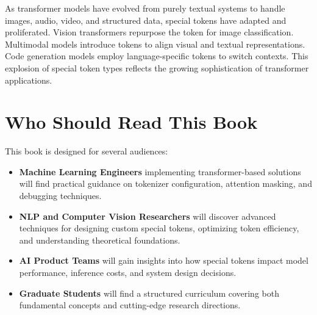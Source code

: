 As transformer models have evolved from purely textual systems to handle images, audio, video, and structured data, special tokens have adapted and proliferated. Vision transformers repurpose the \cls{} token for image classification. Multimodal models introduce \img{} tokens to align visual and textual representations. Code generation models employ language-specific tokens to switch contexts. This explosion of special token types reflects the growing sophistication of transformer applications.
\begin{comment}
Feedback: The term "explosion" is a bit cliché in technical writing. Consider a more precise alternative like "This proliferation of special tokens..." or "This diversification...". Also, the examples are great. Could you perhaps hint at the challenges this proliferation creates? E.g., "This proliferation... reflects the growing sophistication... but also introduces new challenges in vocabulary management and cross-modal alignment that this book will address."
\end{comment}

\section*{Who Should Read This Book}

This book is designed for several audiences:

\begin{itemize}[leftmargin=*]
\item \textbf{Machine Learning Engineers} implementing transformer-based solutions will find practical guidance on tokenizer configuration, attention masking, and debugging techniques.

\item \textbf{NLP and Computer Vision Researchers} will discover advanced techniques for designing custom special tokens, optimizing token efficiency, and understanding theoretical foundations.

\item \textbf{AI Product Teams} will gain insights into how special tokens impact model performance, inference costs, and system design decisions.

\item \textbf{Graduate Students} will find a structured curriculum covering both fundamental concepts and cutting-edge research directions.
\end{itemize}
\begin{comment}
Feedback: This section is clear, but a little boilerplate. To make it more compelling, you could frame each point around a problem that audience faces. For example, for ML Engineers: "For Machine Learning Engineers struggling with tokenizer errors or mysterious performance drops, this book provides practical guidance..." For Researchers: "For Researchers looking to move beyond existing architectures, this book will...". This connects the book's content directly to the reader's pain points.
\end{comment}

